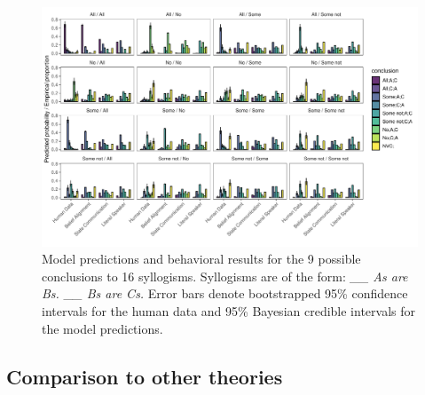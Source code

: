 \documentclass[floatsintext, doc]{apa6}
\newcommand{\datafoldername}{csv_to_tex}
\newcommand{\rlgetvalue}[4]{\csvreader[filter strcmp={\mykey}{#3},
             late after line = {{,}\ }, late after last line = {{}}]
            {\datafoldername/#1}{#2=\mykey,#4=\myvalue}{\myvalue}}
\begin{document}
\begin{figure}[t]
\centering
\includegraphics[width = \textwidth]{figs/bda_rsa_bars_0params.pdf}
\caption{Model predictions and behavioral results for the 9 possible conclusions to 16 syllogisms. Syllogisms are of the form: \emph{\_\_ As are Bs. \_\_ Bs are Cs.} Error bars denote bootstrapped 95\% confidence intervals for the human data and 95\% Bayesian credible intervals for the model predictions.}
\label{fig:bars}
\end{figure}





%
%   
%
%


            


\subsection{Comparison to other theories}
\end{document}
